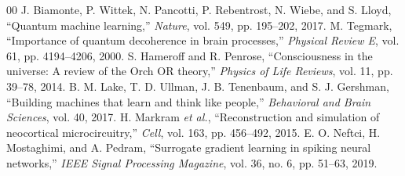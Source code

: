 \documentclass[conference]{IEEEtran}
\begin{document}
\begin{thebibliography}{00}
 J. Biamonte, P. Wittek, N. Pancotti, P. Rebentrost, N. Wiebe,
and S. Lloyd, ``Quantum machine learning,'' \emph{Nature}, vol. 549, pp. 195--202,
2017.
 M. Tegmark, ``Importance of quantum decoherence in brain
processes,'' \emph{Physical Review E}, vol. 61, pp. 4194--4206, 2000.
 S. Hameroff and R. Penrose, ``Consciousness in the universe:
A review of the Orch OR theory,'' \emph{Physics of Life Reviews}, vol. 11, pp. 39--78,
2014.
 B. M. Lake, T. D. Ullman, J. B. Tenenbaum, and S. J. Gershman,
``Building machines that learn and think like people,'' \emph{Behavioral and Brain
Sciences}, vol. 40, 2017.
 H. Markram \emph{et al.}, ``Reconstruction and simulation of
neocortical microcircuitry,'' \emph{Cell}, vol. 163, pp. 456--492, 2015.
 E. O. Neftci, H. Mostaghimi, and A. Pedram, ``Surrogate gradient
learning in spiking neural networks,'' \emph{IEEE Signal Processing Magazine}, vol. 36,
no. 6, pp. 51--63, 2019.
\end{thebibliography}
\end{document}
